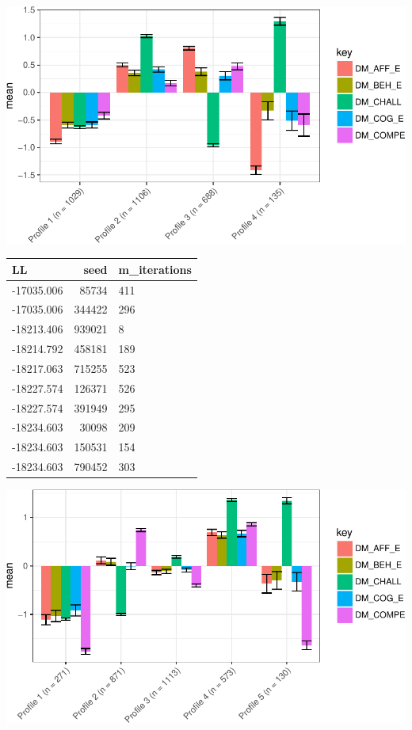 \documentclass[]{msu-thesis}
\theoremstyle{definition}
\theoremstyle{definition}
\theoremstyle{definition}
\theoremstyle{remark}
\begin{document}
\begin{center}\includegraphics[width=0.8\linewidth]{rosenberg-dissertation_files/figure-latex/m2_4p-1} \end{center}

\begin{tabular}{l|r|l}
\hline
LL & seed & m\_iterations\\
\hline
-17035.006 & 85734 & 411\\
\hline
-17035.006 & 344422 & 296\\
\hline
-18213.406 & 939021 & 8\\
\hline
-18214.792 & 458181 & 189\\
\hline
-18217.063 & 715255 & 523\\
\hline
-18227.574 & 126371 & 526\\
\hline
-18227.574 & 391949 & 295\\
\hline
-18234.603 & 30098 & 209\\
\hline
-18234.603 & 150531 & 154\\
\hline
-18234.603 & 790452 & 303\\
\hline
\end{tabular}

\begin{center}\includegraphics[width=0.8\linewidth]{rosenberg-dissertation_files/figure-latex/m2_5p-1} \end{center}
\end{document}
